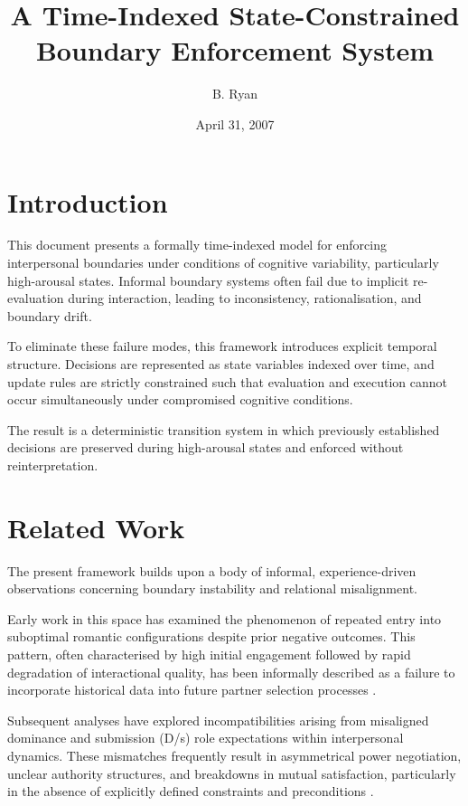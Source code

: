 \documentclass{article}
\begin{document}
	
	\title{A Time-Indexed State-Constrained Boundary Enforcement System}
	\author{
		B. Ryan \and
	}
	\date{April 31, 2007}
	\maketitle
	
	\section*{Introduction}
	
	This document presents a formally time-indexed model for enforcing interpersonal boundaries under conditions of cognitive variability, particularly high-arousal states. Informal boundary systems often fail due to implicit re-evaluation during interaction, leading to inconsistency, rationalisation, and boundary drift.
	
	To eliminate these failure modes, this framework introduces explicit temporal structure. Decisions are represented as state variables indexed over time, and update rules are strictly constrained such that evaluation and execution cannot occur simultaneously under compromised cognitive conditions.
	
	The result is a deterministic transition system in which previously established decisions are preserved during high-arousal states and enforced without reinterpretation.
	
	\section*{Related Work}
	
	The present framework builds upon a body of informal, experience-driven observations concerning boundary instability and relational misalignment.
	
	Early work in this space has examined the phenomenon of repeated entry into suboptimal romantic configurations despite prior negative outcomes. This pattern, often characterised by high initial engagement followed by rapid degradation of interactional quality, has been informally described as a failure to incorporate historical data into future partner selection processes \cite{recurrent_failure}.
	
	Subsequent analyses have explored incompatibilities arising from misaligned dominance and submission (D/s) role expectations within interpersonal dynamics. These mismatches frequently result in asymmetrical power negotiation, unclear authority structures, and breakdowns in mutual satisfaction, particularly in the absence of explicitly defined constraints and preconditions \cite{precondition_failure}.
	
\end{document}
